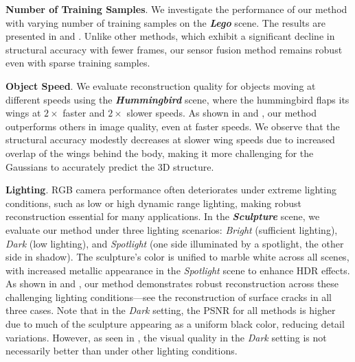 \vspace{1mm}
\noindent
\textbf{Number of Training Samples}. 
We investigate the performance of our method with varying number of training samples on the \textit{\textbf{Lego}} scene.
The results are presented in \tableautorefname{~\ref{tab:conditions}} and \figureautorefname{~\ref{fig:num_frames}}. 
Unlike other methods, which exhibit a significant decline in structural accuracy with fewer frames, our sensor fusion method remains robust even with sparse training samples.

\vspace{1mm}
\noindent
\textbf{Object Speed}. 
We evaluate reconstruction quality for objects moving at different speeds using the \textit{\textbf{Hummingbird}} scene, where the hummingbird flaps its wings at %
$2\times$ faster and $2\times$ slower speeds. 
As shown in \tableautorefname{\ref{tab:conditions}} and \figureautorefname{\ref{fig:object_speed}}, our method outperforms others in image quality, even at faster speeds. 
We observe that the structural accuracy modestly decreases at slower wing speeds due to increased overlap of the wings behind the body, making it more challenging  
for the Gaussians to accurately predict the 3D structure.

\vspace{1mm}
\noindent
\textbf{Lighting}. 
RGB camera performance often deteriorates under extreme lighting conditions, such as low or high dynamic range lighting, making robust reconstruction essential for many applications. 
In the \textit{\textbf{Sculpture}} scene, we evaluate our method under three lighting scenarios: \textit{Bright} (sufficient lighting), \textit{Dark} (low lighting), and \textit{Spotlight} (one side illuminated by a spotlight, the other side in shadow). 
The sculpture's color is unified to marble white across all scenes, with increased metallic appearance in the \textit{Spotlight} scene to enhance HDR effects.
As shown in \tableautorefname{~\ref{tab:conditions}} and \figureautorefname{~\ref{fig:lighting}}, our method demonstrates robust reconstruction across these challenging lighting conditions---see the reconstruction of surface cracks in all three cases. 
Note that in the \textit{Dark} setting, the PSNR for all methods is higher due to much of the sculpture appearing as a uniform black color, reducing detail variations. 
However, as seen in \figureautorefname{~\ref{fig:lighting}}, the visual quality in the \textit{Dark} setting is not necessarily better than under other lighting conditions.
